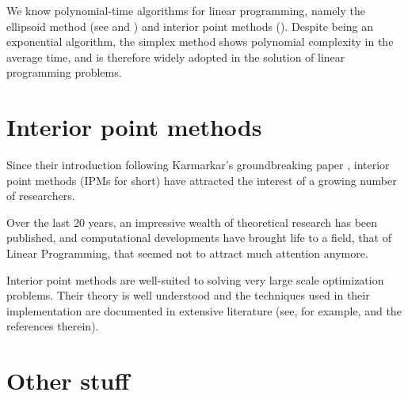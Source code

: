 We know polynomial-time algorithms for linear programming, 
namely the ellipsoid method (see \cite[ch.~13]{Schrijver86} 
and \cite[ch.~I.6]{ip:NemhauserWolsey88}) and interior point 
methods (\cite{ipm:Wright97}). Despite being an exponential 
algorithm, the simplex method shows polynomial complexity in 
the average time, and is therefore widely adopted in the 
solution of linear programming problems.


%
%
\section{Interior point methods}

Since their introduction following Karmarkar's groundbreaking paper
\cite{Karmarkar}, interior point methods (IPMs for short) have attracted 
the interest of a growing number of researchers.


Over the last 20 years, an impressive wealth of theoretical research
has been published, and computational developments have brought life
to a field, that of Linear Programming, that seemed not to attract much
attention anymore.


Interior point methods are well-suited to solving very
large scale optimization problems. Their theory is well understood
\cite{ipm:Wright97} and the techniques used in their implementation 
are documented in extensive literature (see, for example, 
\cite{AndersenGondzioMeszarosXu,GondzioTerlaky} and the references therein).



%
%
\section{Other stuff}


